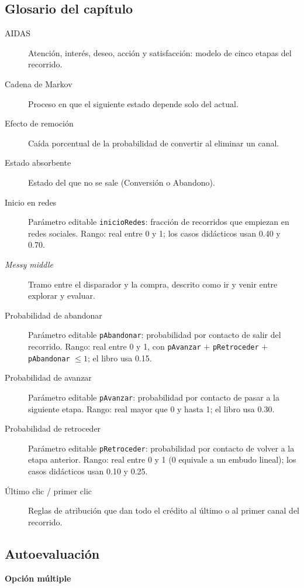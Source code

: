 \subsection*{Glosario del capítulo}
\begin{description}
  \item[AIDAS] Atención, interés, deseo, acción y satisfacción: modelo de cinco etapas del recorrido.
  \item[Cadena de Markov] Proceso en que el siguiente estado depende solo del actual.
  \item[Efecto de remoción] Caída porcentual de la probabilidad de convertir al eliminar un canal.
  \item[Estado absorbente] Estado del que no se sale (Conversión o Abandono).
  \item[Inicio en redes] Parámetro editable \texttt{inicioRedes}: fracción de recorridos que empiezan en redes sociales. Rango: real entre 0 y 1; los casos didácticos usan 0.40 y 0.70.
  \item[\textit{Messy middle}] Tramo entre el disparador y la compra, descrito como ir y venir entre explorar y evaluar.
  \item[Probabilidad de abandonar] Parámetro editable \texttt{pAbandonar}: probabilidad por contacto de salir del recorrido. Rango: real entre 0 y 1, con \texttt{pAvanzar} $+$ \texttt{pRetroceder} $+$ \texttt{pAbandonar} $\le 1$; el libro usa 0.15.
  \item[Probabilidad de avanzar] Parámetro editable \texttt{pAvanzar}: probabilidad por contacto de pasar a la siguiente etapa. Rango: real mayor que 0 y hasta 1; el libro usa 0.30.
  \item[Probabilidad de retroceder] Parámetro editable \texttt{pRetroceder}: probabilidad por contacto de volver a la etapa anterior. Rango: real entre 0 y 1 (0 equivale a un embudo lineal); los casos didácticos usan 0.10 y 0.25.
  \item[Último clic / primer clic] Reglas de atribución que dan todo el crédito al último o al primer canal del recorrido.
\end{description}

\subsection*{Autoevaluación}

\textbf{Opción múltiple}

